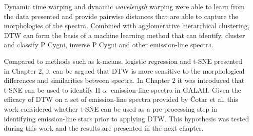 Dynamic time warping and dynamic \emph{wavelength} warping were able to learn from the data presented and provide pairwise distances that are able to capture the morphologies of the spectra. Combined with agglomerative hierarchical clustering, DTW can form the basis of a machine learning method that can identify, cluster and classify P Cygni, inverse P Cygni and other emission-line spectra.

Compared to methods such as k-means, logistic regression and t-SNE presented in Chapter 2, it can be argued that DTW is more sensitive to the morphological differences and similarities between spectra. In Chapter 2 it was introduced that t-SNE can be used to identify H$\upalpha$ emission-line spectra in GALAH. Given the efficacy of DTW on a set of emission-line spectra provided by Čotar et al. this work considered whether t-SNE can be used as a pre-processing step in identifying emission-line stars prior to applying DTW. This hypothesis was tested during this work and the results are presented in the next chapter. 








